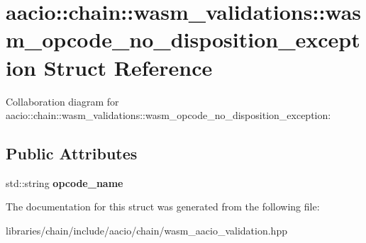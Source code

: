 \hypertarget{structaacio_1_1chain_1_1wasm__validations_1_1wasm__opcode__no__disposition__exception}{}\section{aacio\+:\+:chain\+:\+:wasm\+\_\+validations\+:\+:wasm\+\_\+opcode\+\_\+no\+\_\+disposition\+\_\+exception Struct Reference}
\label{structaacio_1_1chain_1_1wasm__validations_1_1wasm__opcode__no__disposition__exception}


Collaboration diagram for aacio\+:\+:chain\+:\+:wasm\+\_\+validations\+:\+:wasm\+\_\+opcode\+\_\+no\+\_\+disposition\+\_\+exception\+:
\subsection*{Public Attributes}
\begin{DoxyCompactItemize}
\item 
\mbox{\label{structaacio_1_1chain_1_1wasm__validations_1_1wasm__opcode__no__disposition__exception_a83acca21e8e0857dd81b3abdcd21f80f}} 
std\+::string {\bfseries opcode\+\_\+name}
\end{DoxyCompactItemize}


The documentation for this struct was generated from the following file\+:\begin{DoxyCompactItemize}
\item 
libraries/chain/include/aacio/chain/wasm\+\_\+aacio\+\_\+validation.\+hpp\end{DoxyCompactItemize}
